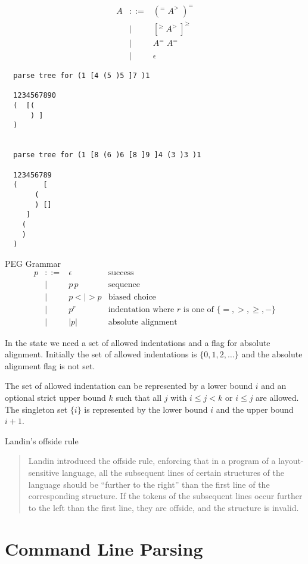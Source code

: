 $$
\begin{array}{lll}
  A &::=& (^= \;  A^> \; )^=
  \\
    &\mid& [^\ge \; A^> \; ]^\ge
  \\
    &\mid& A^= \; A^=
  \\
    &\mid& \epsilon
\end{array}
$$

{\small
\begin{verbatim}
  parse tree for (1 [4 (5 )5 ]7 )1

  1234567890
  (  [(
      ) ]
  )


  parse tree for (1 [8 (6 )6 [8 ]9 ]4 (3 )3 )1

  123456789
  (      [
       (
       ) []
     ]
    (
    )
  )
\end{verbatim}
}


PEG Grammar
$$
\begin{array}{llll}
  p &::=& \epsilon   &\text{success}
  \\
    &\mid& p \, p      &\text{sequence}
  \\
    &\mid& p <\mid> p  &\text{biased choice}
  \\
    &\mid& p^r         &\text{indentation where $r$ is one of }\{=,>,\ge,-\}
  \\
    &\mid& |p|         &\text{absolute alignment}
\end{array}
$$


In the state we need a set of allowed indentations and a flag for absolute
alignment. Initially the set of allowed indentations is $\{0,1,2, \ldots\}$
and the absolute alignment flag is not set.

The set of allowed indentation can be represented by a lower bound $i$ and an
optional strict upper bound $k$ such that all $j$ with $i \le j < k$ or $i \le
j$ are allowed. The singleton set $\{i\}$ is represented by the lower bound
$i$ and the upper bound $i+1$.


Landin's offside rule
\begin{quote}
  Landin introduced the offside rule, enforcing that in a program of a layout-
  sensitive language, all the subsequent lines of certain structures of the
  language should be ``further to the right'' than the first line of the
  corresponding structure. If the tokens of the subsequent lines occur further
  to the left than the first line, they are offside, and the structure is
  invalid.\end{quote}

\section{Command Line Parsing}



